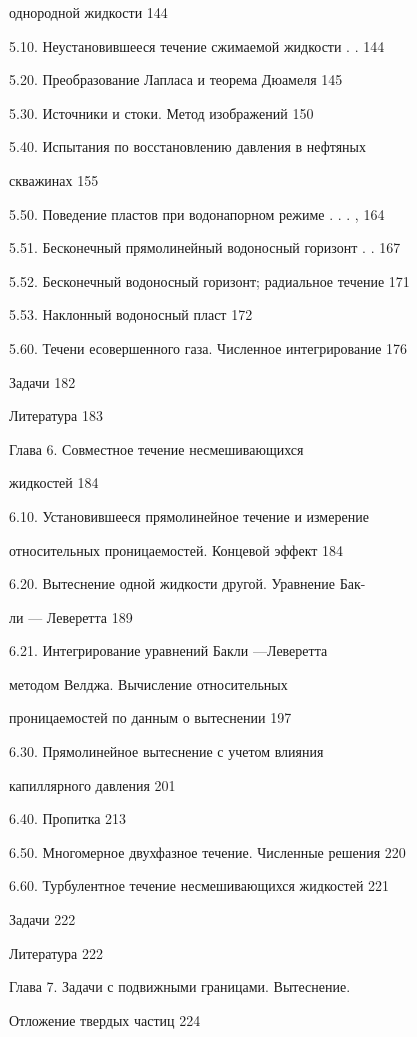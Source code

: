 \documentclass[
  11pt,
]{article}
\begin{document}
однородной жидкости 144 \par
5.10. Неустановившееся течение сжимаемой жидкости . . 144 \par
5.20. Преобразование Лапласа и теорема Дюамеля 145 \par
5.30. Источники и стоки. Метод изображений 150 \par
5.40. Испытания по восстановлению давления в нефтяных \par
скважинах 155 \par
5.50. Поведение пластов при водонапорном режиме . . . , 164 \par
5.51. Бесконечный прямолинейный водоносный горизонт . . 167 \par
5.52. Бесконечный водоносный горизонт; радиальное течение 171 \par
5.53. Наклонный водоносный пласт 172 \par
5.60. Течени есовершенного газа. Численное интегрирование 176 \par
Задачи 182 \par
Литература 183 \par
Глава 6. Совместное течение несмешивающихся  \par
жидкостей 184 \par
6.10. Установившееся прямолинейное течение и измерение \par
относительных проницаемостей. Концевой эффект 184 \par
6.20. Вытеснение одной жидкости другой. Уравнение Бак- \par
ли --- Леверетта 189 \par
6.21. Интегрирование уравнений Бакли ---Леверетта  \par
методом Велджа. Вычисление относительных  \par
проницаемостей по данным о вытеснении 197 \par
6.30. Прямолинейное вытеснение с учетом влияния  \par
капиллярного давления 201 \par
6.40. Пропитка 213 \par
6.50. Многомерное двухфазное течение. Численные решения 220 \par
6.60. Турбулентное течение несмешивающихся жидкостей 221 \par
Задачи 222 \par
Литература 222 \par
Глава 7. Задачи с подвижными границами. Вытеснение. \par
Отложение твердых частиц 224 \par
\end{document}
